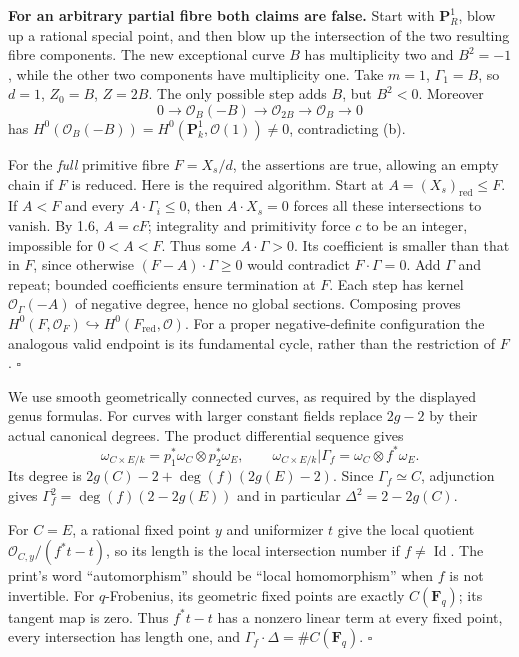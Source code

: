 \documentclass[11pt]{article}
\let\chapterexercise\exercise
\renewcommand{\exercise}[2]{\Needspace{8\baselineskip}\chapterexercise{#1}{#2}}
\begin{document}
\pf \textbf{For an arbitrary partial fibre both claims are false.} Start with $\mathbf P^1_R$, blow up a rational special point, and then blow up the intersection of the two resulting fibre components. The new exceptional curve $B$ has multiplicity two and $B^2=-1$, while the other two components have multiplicity one. Take $m=1$, $\Gamma_1=B$, so $d=1$, $Z_0=B$, $Z=2B$. The only possible step adds $B$, but $B^2<0$. Moreover
\[ 0\longrightarrow\mathcal O_B(-B)\longrightarrow\mathcal O_{2B}
\longrightarrow\mathcal O_B\longrightarrow0 \]
has $H^0(\mathcal O_B(-B))=H^0(\mathbf P^1_k,\mathcal O(1))\ne0$, contradicting (b).

For the \emph{full} primitive fibre $F=X_s/d$, the assertions are true, allowing an empty chain if $F$ is reduced. Here is the required algorithm. Start at $A=(X_s)_{\mathrm{red}}\le F$. If $A<F$ and every $A\cdot\Gamma_i\le0$, then $A\cdot X_s=0$ forces all these intersections to vanish. By 1.6, $A=cF$; integrality and primitivity force $c$ to be an integer, impossible for $0<A<F$. Thus some $A\cdot\Gamma>0$. Its coefficient is smaller than that in $F$, since otherwise $(F-A)\cdot\Gamma\ge0$ would contradict $F\cdot\Gamma=0$. Add $\Gamma$ and repeat; bounded coefficients ensure termination at $F$. Each step has kernel $\mathcal O_\Gamma(-A)$ of negative degree, hence no global sections. Composing proves $H^0(F,\mathcal O_F)\hookrightarrow H^0(F_{\mathrm{red}},\mathcal O)$. For a proper negative-definite configuration the analogous valid endpoint is its fundamental cycle, rather than the restriction of $F$. \hfill$\square$

\pf We use smooth geometrically connected curves, as required by the displayed genus formulas. For curves with larger constant fields replace $2g-2$ by their actual canonical degrees. The product differential sequence gives
\[ \omega_{C\times E/k}=p_1^*\omega_C\otimes p_2^*\omega_E,
\qquad \omega_{C\times E/k}|\Gamma_f=\omega_C\otimes f^*\omega_E. \]
Its degree is $2g(C)-2+\deg(f)(2g(E)-2)$. Since $\Gamma_f\simeq C$, adjunction gives $\Gamma_f^2=\deg(f)(2-2g(E))$ and in particular $\Delta^2=2-2g(C)$.

For $C=E$, a rational fixed point $y$ and uniformizer $t$ give the local quotient $\mathcal O_{C,y}/(f^*t-t)$, so its length is the local intersection number if $f\ne\operatorname{Id}$. The print's word ``automorphism'' should be ``local homomorphism'' when $f$ is not invertible. For $q$-Frobenius, its geometric fixed points are exactly $C(\mathbf F_q)$; its tangent map is zero. Thus $f^*t-t$ has a nonzero linear term at every fixed point, every intersection has length one, and $\Gamma_f\cdot\Delta=\#C(\mathbf F_q)$. \hfill$\square$
\end{document}
